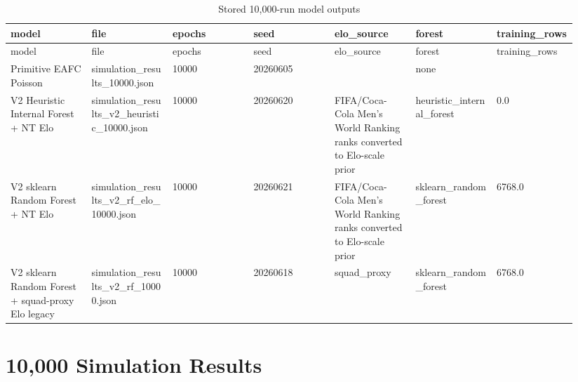 \documentclass[10pt]{article}
\begin{document}
\begin{longtable}{p{0.134\linewidth}p{0.134\linewidth}p{0.134\linewidth}p{0.134\linewidth}p{0.134\linewidth}p{0.134\linewidth}p{0.134\linewidth}}
\caption{Stored 10,000-run model outputs}\\
\toprule
model & file & epochs & seed & elo\_source & forest & training\_rows \\
\midrule
\endfirsthead
\toprule
model & file & epochs & seed & elo\_source & forest & training\_rows \\
\midrule
\endhead
Primitive EAFC Poisson & simulation\_results\_10000.json & 10000 & 20260605 &  & none &  \\
V2 Heuristic Internal Forest + NT Elo & simulation\_results\_v2\_heuristic\_10000.json & 10000 & 20260620 & FIFA/Coca-Cola Men's World Ranking ranks converted to Elo-scale prior & heuristic\_internal\_forest & 0.0 \\
V2 sklearn Random Forest + NT Elo & simulation\_results\_v2\_rf\_elo\_10000.json & 10000 & 20260621 & FIFA/Coca-Cola Men's World Ranking ranks converted to Elo-scale prior & sklearn\_random\_forest & 6768.0 \\
V2 sklearn Random Forest + squad-proxy Elo legacy & simulation\_results\_v2\_rf\_10000.json & 10000 & 20260618 & squad\_proxy & sklearn\_random\_forest & 6768.0 \\
\bottomrule
\end{longtable}


\section{10,000 Simulation Results}
\end{document}
